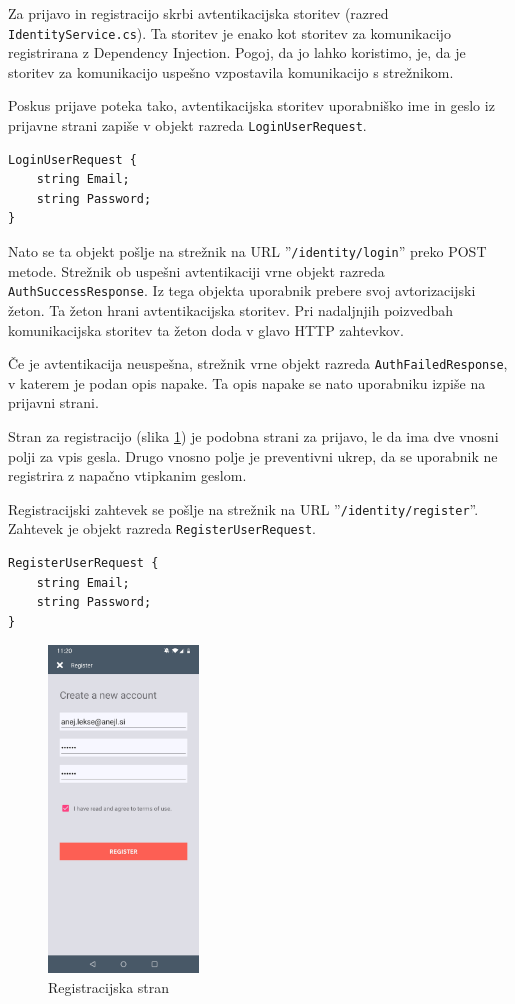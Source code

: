 \documentclass[a4paper, 12pt]{book}
\begin{document}
Za prijavo in registracijo skrbi avtentikacijska storitev (razred \\\texttt{IdentityService.cs}).
Ta storitev je enako kot storitev za komunikacijo registrirana z Dependency Injection.
Pogoj, da jo lahko koristimo, je, da je storitev za komunikacijo uspešno vzpostavila komunikacijo s strežnikom.

Poskus prijave poteka tako, avtentikacijska storitev uporabniško ime in geslo iz prijavne strani zapiše v objekt razreda \texttt{LoginUserRequest}.

\begin{Verbatim}[commandchars=+\[\]]
LoginUserRequest {
    string Email; 
    string Password;
}
\end{Verbatim}

Nato se ta objekt pošlje na strežnik na URL ''\texttt{/identity/login}'' preko POST metode.
Strežnik ob uspešni avtentikaciji vrne objekt razreda \texttt{AuthSuccessResponse}.
Iz tega objekta uporabnik prebere svoj avtorizacijski žeton.
Ta žeton hrani avtentikacijska storitev.
Pri nadaljnjih poizvedbah komunikacijska storitev ta žeton doda v glavo HTTP zahtevkov.

Če je avtentikacija neuspešna, strežnik vrne objekt razreda \texttt{AuthFailedResponse}, v katerem je podan opis napake.
Ta opis napake se nato uporabniku izpiše na prijavni strani.

Stran za registracijo (slika \ref{app_register}) je podobna strani za prijavo, le da ima dve vnosni polji za vpis gesla.
Drugo vnosno polje je preventivni ukrep, da se uporabnik ne registrira z napačno vtipkanim geslom.

Registracijski zahtevek se pošlje na strežnik na URL ''\texttt{/identity/register}''.
Zahtevek je objekt razreda \texttt{RegisterUserRequest}.

\begin{Verbatim}[commandchars=+\[\]]
RegisterUserRequest {
    string Email; 
    string Password;
}
\end{Verbatim}

\begin{figure}[H]
\begin{center}
\includegraphics[width=4cm]{app_register}
\end{center}
	\caption{Registracijska stran}
\label{app_register}
\end{figure}
\end{document}
